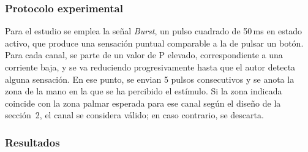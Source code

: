 \documentclass[12pt]{article}
\begin{document}
\subsubsection{Protocolo experimental}

Para el estudio se emplea la señal \textit{Burst}, un pulso cuadrado de 50\,ms en estado activo, que produce una sensación puntual comparable a la de pulsar un botón. Para cada canal, se parte de un valor de $\mathrm{P}$ elevado, correspondiente a una corriente baja, y se va reduciendo progresivamente hasta que el autor detecta alguna sensación. En ese punto, se envian 5 pulsos consecutivos y se anota la zona de la mano en la que se ha percibido el estímulo. Si la zona indicada coincide con la zona palmar esperada para ese canal según el diseño de la sección~2, el canal se considera válido; en caso contrario, se descarta.

\subsubsection{Resultados}
\end{document}
